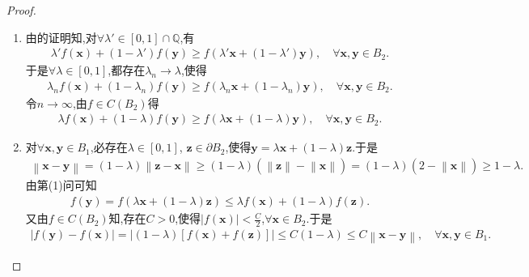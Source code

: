 \documentclass[../../main.tex]{subfiles}%
\begin{document}
\begin{proof}
\begin{enumerate}[(1)]
\item 由的证明知,对$\forall \lambda' \in \left[ 0,1 \right] \cap \mathbb{Q}$,有
\begin{align*}
\lambda' f\left( \mathbf{x} \right) +\left( 1-\lambda' \right) f\left( \mathbf{y} \right) \geqslant f\left( \lambda' \mathbf{x}+\left( 1-\lambda' \right) \mathbf{y} \right),\quad \forall \mathbf{x},\mathbf{y}\in B_2.
\end{align*}
于是$\forall \lambda \in \left[ 0,1 \right]$,都存在$\lambda_n\rightarrow \lambda$,使得
\begin{align*}
\lambda_n f\left( \mathbf{x} \right) +\left( 1-\lambda_n \right) f\left( \mathbf{y} \right) \geqslant f\left( \lambda_n \mathbf{x}+\left( 1-\lambda_n \right) \mathbf{y} \right),\quad \forall \mathbf{x},\mathbf{y}\in B_2.
\end{align*}
令$n\rightarrow \infty$,由$f\in C\left( B_2 \right)$得
\begin{align*}
\lambda f\left( \mathbf{x} \right) +\left( 1-\lambda \right) f\left( \mathbf{y} \right) \geqslant f\left( \lambda \mathbf{x}+\left( 1-\lambda \right) \mathbf{y} \right),\quad \forall \mathbf{x},\mathbf{y}\in B_2.
\end{align*}

\item 对$\forall \mathbf{x},\mathbf{y}\in B_1$,必存在$\lambda \in \left[ 0,1 \right]$, $\mathbf{z}\in \partial B_2$,使得$\mathbf{y}=\lambda \mathbf{x}+\left( 1-\lambda \right) \mathbf{z}$.于是
\begin{align*}
\left\| \mathbf{x}-\mathbf{y} \right\| 
=\left( 1-\lambda \right) \left\| \mathbf{z}-\mathbf{x} \right\| 
\geqslant \left( 1-\lambda \right) \left( \left\| \mathbf{z} \right\| -\left\| \mathbf{x} \right\| \right) 
=\left( 1-\lambda \right) \left( 2-\left\| \mathbf{x} \right\| \right) 
\geqslant 1-\lambda.
\end{align*}
由第(1)问可知
\begin{align*}
f\left( \mathbf{y} \right) =f\left( \lambda \mathbf{x}+\left( 1-\lambda \right) \mathbf{z} \right) \leqslant \lambda f\left( \mathbf{x} \right) +\left( 1-\lambda \right) f\left( \mathbf{z} \right).
\end{align*}
又由$f\in C\left( B_2 \right)$知,存在$C>0$,使得$\left| f\left( \mathbf{x} \right) \right|<\frac{C}{2}$,$\forall \mathbf{x}\in B_2$.于是
\begin{align*}
\left| f\left( \mathbf{y} \right) -f\left( \mathbf{x} \right) \right|
=\left| \left( 1-\lambda \right) \left[ f\left( \mathbf{x} \right) +f\left( \mathbf{z} \right) \right] \right| 
\leqslant C\left( 1-\lambda \right) 
\leqslant C\left\| \mathbf{x}-\mathbf{y} \right\|,\quad \forall \mathbf{x},\mathbf{y}\in B_1.
\end{align*}
\end{enumerate}
\end{proof}
\end{document}
